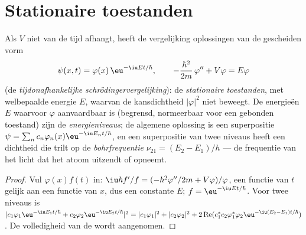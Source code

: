 \section{Stationaire toestanden}

\begin{theorem}\label{thm:b2:schrodinger-wave-functions:stationary}
Als $V$ niet van de tijd afhangt, heeft de vergelijking oplossingen van de
gescheiden vorm
\[
\psi(x,t) = \varphi(x)\,\eu^{-\iu Et/\hbar}, \qquad
-\frac{\hbar^2}{2m}\,\varphi'' + V\varphi = E\varphi
\]
(de \emph{tijdonafhankelijke schrödingervergelijking}): de \emph{stationaire toestanden}, met welbepaalde energie $E$, waarvan de kansdichtheid
$|\varphi|^2$ niet beweegt. De energieën $E$ waarvoor $\varphi$
aanvaardbaar is (begrensd, normeerbaar voor een gebonden toestand) zijn de
\emph{energieniveaus}; de algemene oplossing is een superpositie
$\psi =
\sum_nc_n\varphi_n(x)\eu^{-\iu E_nt/\hbar}$, en een superpositie van
twee niveaus
heeft een dichtheid die trilt op de \emph{bohrfrequentie} $\nu_{21} = (E_2 - E_1)/h$ --- de frequentie van het licht dat het
atoom uitzendt of opneemt.
\end{theorem}

\begin{proof}
Vul $\varphi(x)f(t)$ in:
$\iu\hbar f'/f = (-\hbar^2\varphi''/2m + V\varphi)/\varphi$,
een functie van $t$ gelijk aan een functie van $x$, dus een constante $E$;
$f
= \eu^{-\iu Et/\hbar}$. Voor twee niveaus is
$|c_1\varphi_1\eu^{-\iu E_1t/\hbar} +
c_2\varphi_2\eu^{-\iu E_2t/\hbar}|^2 = |c_1\varphi_1|^2 + |c_2\varphi_2|^2 +
2\operatorname{Re}(c_1^*c_2\varphi_1^*\varphi_2\eu^{-\iu(E_2 - E_1)t/\hbar})$.
De volledigheid van de  wordt aangenomen.
\end{proof}

